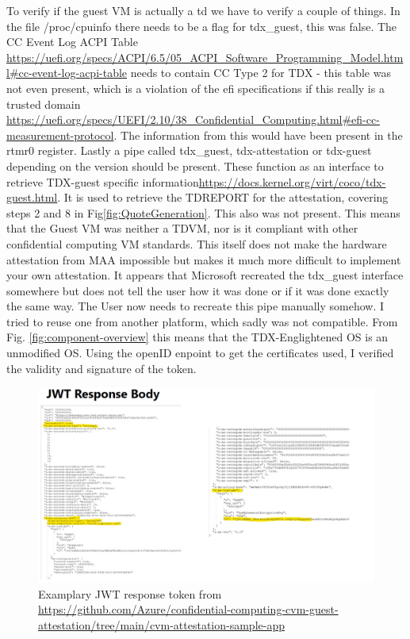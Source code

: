 To verify if the guest VM is actually a td we have to verify a couple of things. In the file /proc/cpuinfo there needs to be a flag for tdx\_guest, this was false. The CC Event Log ACPI Table \url{https://uefi.org/specs/ACPI/6.5/05_ACPI_Software_Programming_Model.html#cc-event-log-acpi-table} needs to contain CC Type 2 for TDX - this table was not even present, which is a violation of the efi specifications if this really is a trusted domain \url{https://uefi.org/specs/UEFI/2.10/38_Confidential_Computing.html#efi-cc-measurement-protocol}. The information from this would have been present in the rtmr0 register. Lastly a pipe called tdx\_guest, tdx-attestation or tdx-guest depending on the version should be present. These function as an interface to retrieve TDX-guest specific information\url{https://docs.kernel.org/virt/coco/tdx-guest.html}. It is used to retrieve the TDREPORT for the attestation, covering steps 2 and 8 in Fig\ref{fig:QuoteGeneration}.  This also was not present. This means that the Guest VM was neither a TDVM, nor is it compliant with other confidential computing VM standards. This itself does not make the hardware attestation from MAA impossible but makes it much more difficult to implement your own attestation. It appears that Microsoft recreated the tdx\_guest interface somewhere but does not tell the user how it was done or if it was done exactly the same way. The User now needs to recreate this pipe manually somehow. I tried to reuse one from another platform, which sadly was not compatible.
From Fig. \ref{fig:component-overview} this means that the TDX-Englightened OS is an unmodified OS.
Using the openID enpoint to get the certificates used, I verified the validity and signature of the token. 


\begin{figure}
\centering
\includegraphics[width=\textwidth]{figures/JWT-response-token-azure-attestation.png}
\caption{Examplary JWT response token from \url{https://github.com/Azure/confidential-computing-cvm-guest-attestation/tree/main/cvm-attestation-sample-app}}
\label{fig:STREAM full results}
\end{figure}

